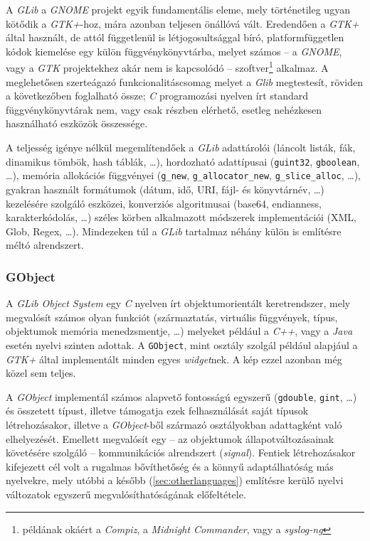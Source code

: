 A \textit{GLib} a \textit{GNOME} projekt egyik fundamentális eleme, mely történetileg ugyan kötődik a \textit{GTK+}-hoz, mára azonban teljesen önállóvá vált. Eredendően a \textit{GTK+} által használt, de attól függetlenül is létjogosultsággal bíró, platformfüggetlen kódok kiemelése egy külön függvénykönyvtárba, melyet számos -- a \textit{GNOME}, vagy a \textit{GTK} projektekhez akár nem is kapcsolódó -- szoftver\footnote{példának okáért a \textit{Compiz}, a \textit{Midnight Commander}, vagy a \textit{syslog-ng}} alkalmaz. A meglehetősen szerteágazó funkcionalitáscsomag melyet a \textit{Glib} megtestesít, röviden a következőben foglalható össze; \textit{C} programozási nyelven írt standard függvénykönyvtárak nem, vagy csak részben elérhető, esetleg nehézkesen használható eszközök összessége.

A teljesség igénye nélkül megemlítendőek a \textit{GLib} adattárolói (láncolt listák, fák, dinamikus tömbök, hash táblák, \dots), hordozható adattípusai (\texttt{guint32}, \texttt{gboolean}, \dots), memória allokációs függvényei (\texttt{g\_new}, \texttt{g\_allocator\_new}, \texttt{g\_slice\_alloc}, \dots), gyakran használt formátumok (dátum, idő, URI, fájl- és könyvtárnév, \dots) kezelésére szolgáló eszközei, konverziós algoritmusai (base64, endianness, karakterkódolás, \dots) széles körben alkalmazott módszerek implementációi (XML, Glob, Regex, \dots). Mindezeken túl a \textit{GLib} tartalmaz néhány külön is említésre méltó alrendszert.

\subsubsection{GObject}

A \textit{GLib Object System} egy \textit{C} nyelven írt objektumorientált keretrendszer, mely megvalósít számos olyan funkciót (származtatás, virtuális függvények, típus, objektumok memória menedzsmentje, \dots) melyeket például a \textit{C++}, vagy a \textit{Java} esetén nyelvi szinten adottak. A \texttt{GObject}, mint osztály szolgál például alapjául a \textit{GTK+} által implementált minden egyes \textit{widget}nek. A kép ezzel azonban még közel sem teljes.

A \textit{GObject} implementál számos alapvető fontosságú egyszerű (\texttt{gdouble}, \texttt{gint}, \dots) és összetett típust, illetve támogatja ezek felhasználását saját típusok létrehozásakor, illetve a \textit{GObject}-ből származó osztályokban adattagként való elhelyezését. Emellett megvalósít egy -- az objektumok állapotváltozásainak követésére szolgáló -- kommunikációs alrendszert (\textit{signal}).  Fentiek létrehozásakor kifejezett cél volt a rugalmas bővíthetőség és a könnyű adaptálhatóság más nyelvekre, mely utóbbi a később (\ref{sec:otherlanguages}) említésre kerülő nyelvi változatok egyszerű megvalósíthatóságának előfeltétele.


